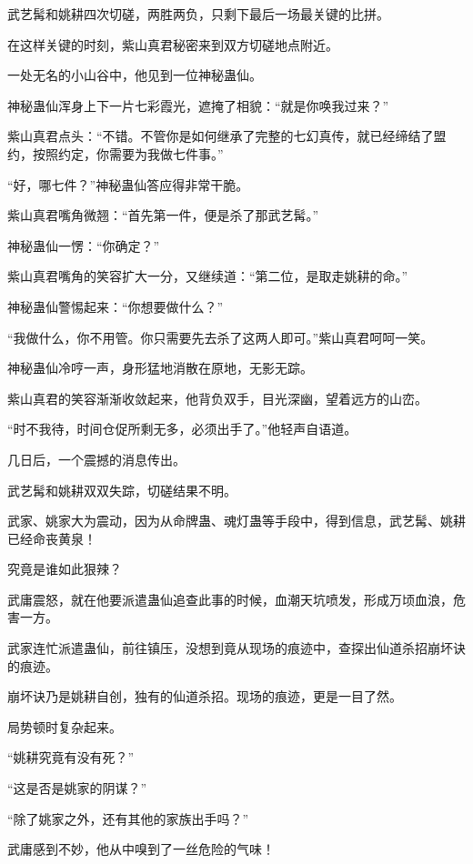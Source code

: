 \begin{this_body}
武艺髯和姚耕四次切磋，两胜两负，只剩下最后一场最关键的比拼。

在这样关键的时刻，紫山真君秘密来到双方切磋地点附近。

一处无名的小山谷中，他见到一位神秘蛊仙。

神秘蛊仙浑身上下一片七彩霞光，遮掩了相貌：“就是你唤我过来？”

紫山真君点头：“不错。不管你是如何继承了完整的七幻真传，就已经缔结了盟约，按照约定，你需要为我做七件事。”

“好，哪七件？”神秘蛊仙答应得非常干脆。

紫山真君嘴角微翘：“首先第一件，便是杀了那武艺髯。”

神秘蛊仙一愣：“你确定？”

紫山真君嘴角的笑容扩大一分，又继续道：“第二位，是取走姚耕的命。”

神秘蛊仙警惕起来：“你想要做什么？”

“我做什么，你不用管。你只需要先去杀了这两人即可。”紫山真君呵呵一笑。

神秘蛊仙冷哼一声，身形猛地消散在原地，无影无踪。

紫山真君的笑容渐渐收敛起来，他背负双手，目光深幽，望着远方的山峦。

“时不我待，时间仓促所剩无多，必须出手了。”他轻声自语道。

几日后，一个震撼的消息传出。

武艺髯和姚耕双双失踪，切磋结果不明。

武家、姚家大为震动，因为从命牌蛊、魂灯蛊等手段中，得到信息，武艺髯、姚耕已经命丧黄泉！

究竟是谁如此狠辣？

武庸震怒，就在他要派遣蛊仙追查此事的时候，血潮天坑喷发，形成万顷血浪，危害一方。

武家连忙派遣蛊仙，前往镇压，没想到竟从现场的痕迹中，查探出仙道杀招崩坏诀的痕迹。

崩坏诀乃是姚耕自创，独有的仙道杀招。现场的痕迹，更是一目了然。

局势顿时复杂起来。

“姚耕究竟有没有死？”

“这是否是姚家的阴谋？”

“除了姚家之外，还有其他的家族出手吗？”

武庸感到不妙，他从中嗅到了一丝危险的气味！

\end{this_body}

